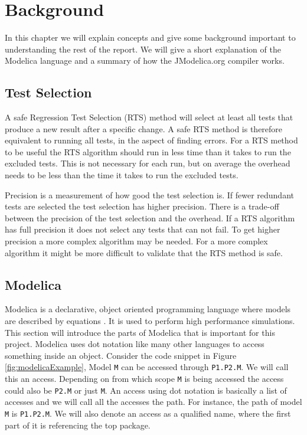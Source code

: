 \documentclass{cslthse-msc}
\begin{document}
\chapter[Background]{Background}
In this chapter we will explain concepts and give some background important to understanding the rest of the report. We will give a short explanation of the Modelica language and a summary of how the JModelica.org compiler works.

\section{Test Selection}
A safe Regression Test Selection (RTS) method will select at least all tests that produce a new result after a specific change. \cite{DBLP:conf/pppj/OqvistHM16} A safe RTS method is therefore equivalent to running all tests, in the aspect of finding errors. For a RTS method to be useful the RTS algorithm should run in less time than it takes to run the excluded tests. This is not necessary for each run, but on average the overhead needs to be less than the time it takes to run the excluded tests.

Precision is a measurement of how good the test selection is. \cite{DBLP:conf/sigsoft/LegunsenHSLZM16} If fewer redundant tests are selected the test selection has higher precision. There is a trade-off between the precision of the test selection and the overhead. If a RTS algorithm has full precision it does not select any tests that can not fail. To get higher precision a more complex algorithm may be needed. For a more complex algorithm it might be more difficult to validate that the RTS method is safe.

\section{Modelica}
Modelica is a declarative, object oriented programming language where models are described by equations \cite{modelicamodelica}. It is used to perform high performance simulations. This section will introduce the parts of Modelica that is important for this project.
Modelica uses dot notation like many other languages to access something inside an object. Consider the code snippet in Figure \ref{fig:modelicaExample}, Model \texttt{M} can be accessed through \texttt{P1.P2.M}. We will call this an access. Depending on from which scope \texttt{M} is being accessed the access could also be \texttt{P2.M} or just \texttt{M}. An access using dot notation is basically a list of accesses and we will call all the accesses the path. For instance, the path of model \texttt{M} is \texttt{P1.P2.M}. We will also denote an access as a qualified name, where the first part of it is referencing the top package.
\end{document}
